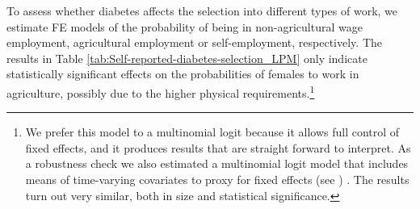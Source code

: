 \documentclass[12pt,english]{article}
\begin{document}
To assess whether diabetes affects the selection into different types of work, we estimate \ac{FE} models of the probability of being in non-agricultural wage employment, agricultural employment or self-employment, respectively. The results in Table \ref{tab:Self-reported-diabetes-selection_LPM} only indicate statistically significant effects on the probabilities of females to work in agriculture, possibly due to the higher physical requirements.\footnote{We prefer this model to a multinomial logit because it allows full control of fixed effects, and it produces results that are straight forward to interpret. As a robustness check we also estimated a multinomial logit model that includes means of time-varying covariates to proxy for fixed effects (see \textcite{Mundlak1978,Bell2015}) \parencite{Bell2015}. The results turn out very similar, both in size and statistical significance.}
\end{document}
